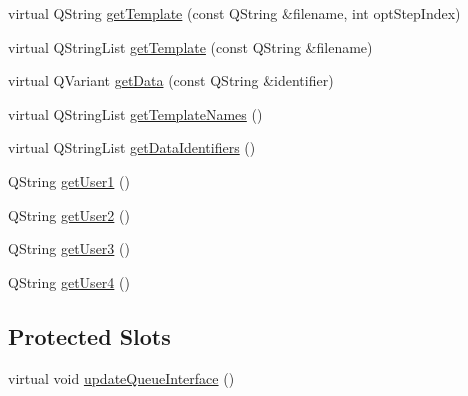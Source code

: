 \begin{DoxyCompactItemize}
\item 
virtual Q\-String \hyperlink{classGlobalSearch_1_1Optimizer_a739ab995b0a4cfcf8b9c8fd86e3a9f24}{get\-Template} (const Q\-String \&filename, int opt\-Step\-Index)
\item 
virtual Q\-String\-List \hyperlink{classGlobalSearch_1_1Optimizer_af46e4dd4e1e7dca1c3389fc8f30ea74e}{get\-Template} (const Q\-String \&filename)
\item 
virtual Q\-Variant \hyperlink{classGlobalSearch_1_1Optimizer_a512b302d7bc91999350ead624259a3cf}{get\-Data} (const Q\-String \&identifier)
\item 
virtual Q\-String\-List \hyperlink{classGlobalSearch_1_1Optimizer_a2819ce65995524d999c61b017192f77d}{get\-Template\-Names} ()
\item 
virtual Q\-String\-List \hyperlink{classGlobalSearch_1_1Optimizer_a4fb3da2a83d851f3ab53b8bc29026886}{get\-Data\-Identifiers} ()
\item 
Q\-String \hyperlink{classGlobalSearch_1_1Optimizer_a414f7b1587c6048451191bc915b640c5}{get\-User1} ()
\item 
Q\-String \hyperlink{classGlobalSearch_1_1Optimizer_a26166bc3bc6c3af4baa0e3f12ac41d38}{get\-User2} ()
\item 
Q\-String \hyperlink{classGlobalSearch_1_1Optimizer_a8b93a20caff4d31524283695f011ab85}{get\-User3} ()
\item 
Q\-String \hyperlink{classGlobalSearch_1_1Optimizer_a854917e1b3ba0bc164ab8edff823a3ae}{get\-User4} ()
\end{DoxyCompactItemize}
\subsection*{Protected Slots}
\begin{DoxyCompactItemize}
\item 
virtual void \hyperlink{classGlobalSearch_1_1Optimizer_ad9c1899c333b7aa692bfe7ff252a6222}{update\-Queue\-Interface} ()
\end{DoxyCompactItemize}
